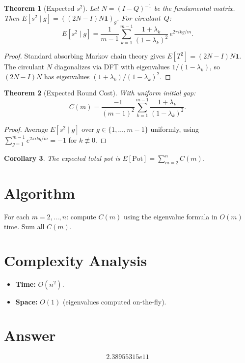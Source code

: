 \documentclass[11pt]{article}
\newtheorem{theorem}{Theorem}
\newtheorem{corollary}[theorem]{Corollary}
\begin{document}
\begin{theorem}[Expected $s^2$]
Let $N=(I-Q)^{-1}$ be the fundamental matrix. Then $E[s^2\mid g] = ((2N-I)N\mathbf{1})_g$. For circulant~$Q$:
\[
E[s^2\mid g] = \frac{1}{m-1}\sum_{k=1}^{m-1}\frac{1+\lambda_k}{(1-\lambda_k)^2}\,e^{2\pi ikg/m}.
\]
\end{theorem}

\begin{proof}
Standard absorbing Markov chain theory gives $E[T^2]=(2N-I)N\mathbf{1}$. The circulant $N$ diagonalizes via DFT with eigenvalues $1/(1-\lambda_k)$, so $(2N-I)N$ has eigenvalues $(1+\lambda_k)/(1-\lambda_k)^2$.
\end{proof}

\begin{theorem}[Expected Round Cost]
With uniform initial gap:
\[
C(m) = \frac{-1}{(m-1)^2}\sum_{k=1}^{m-1}\frac{1+\lambda_k}{(1-\lambda_k)^2}.
\]
\end{theorem}

\begin{proof}
Average $E[s^2\mid g]$ over $g\in\{1,\ldots,m-1\}$ uniformly, using $\sum_{g=1}^{m-1}e^{2\pi ikg/m}=-1$ for $k\not\equiv 0$.
\end{proof}

\begin{corollary}
The expected total pot is $E[\mathrm{Pot}] = \sum_{m=2}^{n}C(m)$.
\end{corollary}

\section{Algorithm}

For each $m=2,\ldots,n$: compute $C(m)$ using the eigenvalue formula in $O(m)$ time. Sum all $C(m)$.

\section{Complexity Analysis}

\begin{itemize}
  \item \textbf{Time:} $O(n^2)$.
  \item \textbf{Space:} $O(1)$ (eigenvalues computed on-the-fly).
\end{itemize}

\section{Answer}

\[
\boxed{2.38955315e11}
\]
\end{document}

